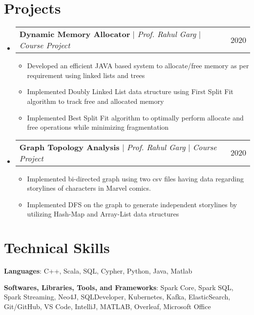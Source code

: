 \documentclass[letterpaper,11pt]{article}
\makeatletter
\newcommand{\resumeItem}[1]{
  \item\small{
    {#1 \vspace{-2pt}}
  }
}
\newcommand{\resumeProjectHeading}[2]{
    \item
    \begin{tabular*}{0.97\textwidth}{l@{\extracolsep{\fill}}r}
      \small#1 & #2 \\
    \end{tabular*}\vspace{-7pt}
}
\newcommand{\resumeSubHeadingListStart}{\begin{itemize}[leftmargin=0.15in, label={}]}
\newcommand{\resumeItemListStart}{\begin{itemize}}
\newcommand{\resumeItemListEnd}{\end{itemize}\vspace{-5pt}}
\makeatother
\begin{document}
\section{Projects}
    \resumeSubHeadingListStart
    
         \resumeProjectHeading
         {\textbf{Dynamic Memory Allocator} $|$ \emph{Prof. Rahul Garg} $|$ \emph{Course Project}}{2020}
          \resumeItemListStart
            \resumeItem{Developed an efficient JAVA based system to allocate/free memory as per requirement using linked lists and trees}
            \resumeItem{Implemented Doubly Linked List data structure using First Split Fit algorithm to track free and allocated memory}
            \resumeItem{Implemented Best Split Fit algorithm to optimally perform allocate and free operations while minimizing fragmentation}
          \resumeItemListEnd
      \resumeProjectHeading
          {\textbf{ Graph Topology Analysis} $|$ \emph{Prof. Rahul Garg} $|$ \emph{Course Project}}{2020}
          \resumeItemListStart
            \resumeItem{Implemented bi-directed graph using two csv files having data regarding storylines of characters in Marvel comics.}
            \resumeItem{Implemented DFS on the graph to generate independent storylines by utilizing Hash-Map and Array-List data structures}
                \resumeItemListEnd
          \resumeItemListEnd
    


\section{Technical Skills}
 \begin{itemize}[leftmargin=0.15in, label={}]
    \small{\item{
     \textbf{Languages}{: C++, Scala, SQL, Cypher, Python, Java,  Matlab} \\ \vspace{3pt}
 
     \textbf{Softwares, Libraries, Tools, and Frameworks}{: Spark Core, Spark SQL, Spark Streaming, Neo4J, SQLDeveloper, Kubernetes, Kafka, ElasticSearch, Git/GitHub, VS Code, IntelliJ, MATLAB, Overleaf, Microsoft Office}

    }}
 \end{itemize}



  
  
\end{document}
